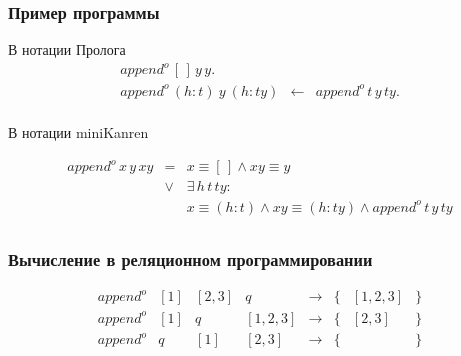 \documentclass{beamer}
\begin{document}
\begin{frame}[fragile]
  \transwipe[direction=90]
  \frametitle{Пример программы}
В нотации Пролога 
$$
\begin{array}{lrl}
append^{o} \, [\,] \, y \, y . &     & \\
append^{o} \, (h:t) \ y \ (h:ty) & \leftarrow    & append^o \, t \, y \, ty. \\ 
\end{array}
$$ 

В нотации miniKanren

$$
\begin{array}{lrl}
append^{o} \, x \, y \, xy & =    & x \equiv [\,] \wedge xy \equiv y \\
                           & \vee & \exists \, h \, t \, ty :  \\
                           &      & x \equiv (h:t) \wedge xy \equiv (h:ty) \wedge append^{o} \, t \, y \, ty \\ 
\end{array}
$$ 
\end{frame}


\begin{frame}[fragile]
  \transwipe[direction=90]
  \frametitle{Вычисление в реляционном программировании}
  
$$ 
\begin{array}{lccccccl}
append^o & [1] & [2, 3] & q         &\rightarrow& \{ &  [1, 2, 3] & \} \\
append^o & [1] & q      & [1, 2, 3] &\rightarrow& \{ & [2, 3] & \} \\
append^o & q   & [1]    & [2, 3]    &\rightarrow& \{ & & \}  \\
\end{array}
$$

\end{frame}
\end{document}
